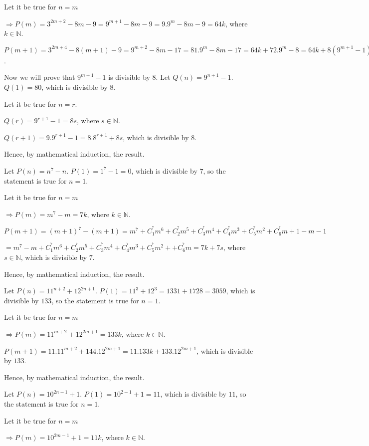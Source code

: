   Let it be true for $n = m$

  $\Rightarrow P(m) = 3^{2m + 2} - 8m - 9 = 9^{m + 1} - 8m - 9 = 9.9^m - 8m - 9 = 64k$, where $k\in\mathbb{N}$.

  $P(m + 1) = 3^{2m + 4} - 8(m + 1) - 9 = 9^{m + 2} - 8m - 17 = 81.9^m - 8m - 17 = 64k + 72.9^m - 8 = 64k +
  8(9^{m + 1} - 1)$.

  Now we will prove that $9^{m + 1} - 1$ is divisible by $8$. Let $Q(n) = 9^{n + 1} - 1$. $Q(1) = 80$, which
  is divisible by $8$.

  Let it be true for $n = r$.

  $Q(r) = 9^{r + 1} - 1 = 8s$, where $s\in\mathbb{N}$.

  $Q(r + 1) = 9.9^{r + 1} - 1 = 8.8^{r + 1} + 8s$, which is divisible by $8$.

  Hence, by mathematical induction, the result.
\item Let $P(n) = n^7 - n$. $P(1) = 1^7 - 1 = 0$, which is divisible by $7$, so the statement is true for $n
  = 1$.

  Let it be true for $n = m$

  $\Rightarrow P(m) = m^7 - m = 7k$, where $k\in\mathbb{N}$.

  $P(m + 1) = (m + 1)^7 - (m + 1) = m^7 + C_1^^7m^6 + C_2^^7m^5 + C_3^^7m^4 + C_4^^7m^3 + C_5^^7m^2 +
  C_6^^7m + 1 - m - 1$

  $= m^7 - m + C_1^^7m^6 + C_2^^7m^5 + C_3^^7m^4 + C_4^^7m^3 + C_5^^7m^2 + + C_6^^7m = 7k + 7s$, where
  $s\in\mathbb{N}$, which is divisible by $7$.

  Hence, by mathematical induction, the result.
\item Let $P(n) = 11^{n + 2} + 12^{2n + 1}$. $P(1) = 11^3 + 12^3 = 1331 + 1728 = 3059$, which is divisible
  by $133$, so the statement is true for $n = 1$.

  Let it be true for $n = m$

  $\Rightarrow P(m) = 11^{m + 2} + 12^{2m + 1} = 133k$, where $k\in\mathbb{N}$.

  $P(m + 1) = 11.11^{m + 2} + 144.12^{2m  + 1} = 11.133k + 133.12^{2m + 1}$, which is divisible by $133$.

  Hence, by mathematical induction, the result.
\item Let $P(n) = 10^{2n - 1} + 1$. $P(1) = 10^{2 - 1} + 1 = 11$, which is divisible by $11$, so the
  statement is true for $n = 1$.

  Let it be true for $n = m$

  $\Rightarrow P(m) = 10^{2m - 1} + 1 = 11k$, where $k\in\mathbb{N}$.

